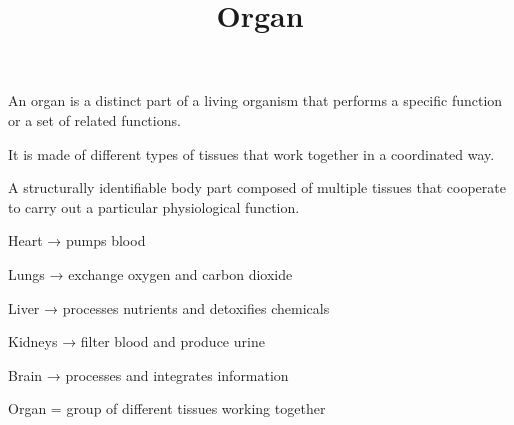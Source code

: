 \documentclass[a4paper]{article}
\title{Organ}
\date{}
\begin{document}
    \maketitle
    An organ is a distinct part of a living organism that performs a specific function or a set of related functions.


    It is made of different types of tissues that work together in a coordinated way.
    
    A structurally identifiable body part composed of multiple tissues that cooperate to carry out a particular physiological function.
    
    Heart → pumps blood

    Lungs → exchange oxygen and carbon dioxide
    
    Liver → processes nutrients and detoxifies chemicals
    
    Kidneys → filter blood and produce urine
    
    Brain → processes and integrates information
    
    Organ = group of different tissues working together
\end{document}
